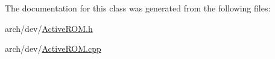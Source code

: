 The documentation for this class was generated from the following files\+:\begin{DoxyCompactItemize}
\item 
arch/dev/\hyperlink{_active_r_o_m_8h}{Active\+R\+O\+M.\+h}\item 
arch/dev/\hyperlink{_active_r_o_m_8cpp}{Active\+R\+O\+M.\+cpp}\end{DoxyCompactItemize}
